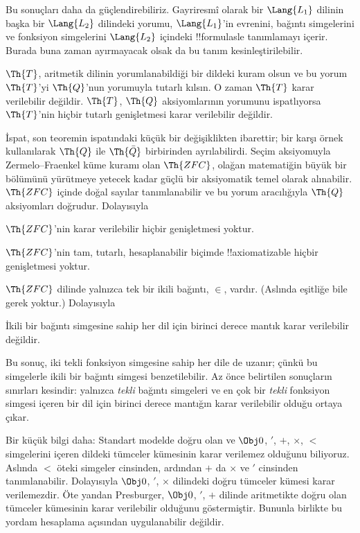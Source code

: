 \documentclass[../../../include/open-logic-section]{subfiles}
\begin{document}


Bu sonuçları daha da güçlendirebiliriz. Gayriresmî olarak bir
$\Lang{L_1}$ dilinin başka bir $\Lang{L_2}$ dilindeki yorumu,
$\Lang{L_1}$'in evrenini, bağıntı simgelerini ve fonksiyon simgelerini
$\Lang{L_2}$ içindeki !!{formula}s{}le tanımlamayı içerir. Burada buna zaman
ayırmayacak olsak da bu tanım kesinleştirilebilir.

\begin{thm}
  $\Th{T}$, aritmetik dilinin yorumlanabildiği bir dildeki kuram olsun ve
  bu yorum $\Th{T}$'yi $\Th{Q}$'nun yorumuyla tutarlı kılsın. O zaman
  $\Th{T}$ karar verilebilir değildir. $\Th{T}$, $\Th{Q}$ aksiyomlarının
  yorumunu ispatlıyorsa $\Th{T}$'nin hiçbir tutarlı genişletmesi karar
  verilebilir değildir.
\end{thm}

İspat, son teoremin ispatındaki küçük bir değişiklikten ibarettir; bir karşı
örnek kullanılarak $\Th{Q}$ ile $\Th{\bar Q}$ birbirinden ayrılabilirdi.
Seçim aksiyomuyla Zermelo--Fraenkel küme kuramı olan
$\Th{ZFC}$, olağan matematiğin büyük bir bölümünü yürütmeye yetecek kadar
güçlü bir aksiyomatik temel olarak alınabilir. $\Th{ZFC}$ içinde doğal
sayılar tanımlanabilir ve bu yorum aracılığıyla $\Th{Q}$ aksiyomları
doğrudur. Dolayısıyla

\begin{cor}
$\Th{ZFC}$'nin karar verilebilir hiçbir genişletmesi yoktur.
\end{cor}

\begin{cor}
$\Th{ZFC}$'nin tam, tutarlı, hesaplanabilir biçimde !!{axiomatizable} hiçbir
genişletmesi yoktur.
\end{cor}

$\Th{ZFC}$ dilinde yalnızca tek bir ikili bağıntı, $\in$, vardır. (Aslında
eşitliğe bile gerek yoktur.) Dolayısıyla

\begin{cor}
İkili bir bağıntı simgesine sahip her dil için birinci derece mantık karar
verilebilir değildir.
\end{cor}

Bu sonuç, iki tekli fonksiyon simgesine sahip her dile de uzanır; çünkü bu
simgelerle ikili bir bağıntı simgesi benzetilebilir. Az önce belirtilen
sonuçların sınırları kesindir: yalnızca \emph{tekli} bağıntı simgeleri ve en
çok bir \emph{tekli} fonksiyon simgesi içeren bir dil için birinci derece
mantığın karar verilebilir olduğu ortaya çıkar.

Bir küçük bilgi daha: Standart modelde doğru olan ve $\Obj 0$, $'$, $+$,
$\times$, $<$ simgelerini içeren dildeki tümceler kümesinin karar verilemez
olduğunu biliyoruz. Aslında $<$ öteki simgeler cinsinden, ardından $+$ da
$\times$ ve $'$ cinsinden tanımlanabilir. Dolayısıyla $\Obj 0$, $'$,
$\times$ dilindeki doğru tümceler kümesi karar verilemezdir. Öte yandan
Presburger, $\Obj 0$, $'$, $+$ dilinde aritmetikte doğru olan tümceler
kümesinin karar verilebilir olduğunu göstermiştir. Bununla birlikte bu
yordam hesaplama açısından uygulanabilir değildir.
\end{document}
